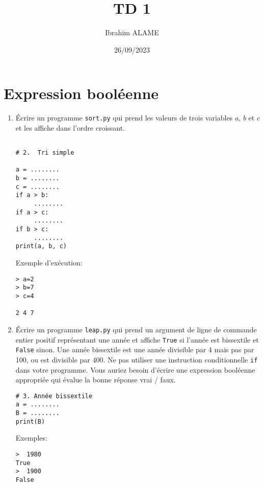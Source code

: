 \documentclass[a4paper]{article}
\title{TD 1}
\author{Ibrahim ALAME}
\date{26/09/2023}
\begin{document}
\maketitle



\section{Expression booléenne}
\begin{enumerate}
\item Écrire un programme {\tt sort.py} qui prend les valeurs de trois variables $a$, $b$ et $c$ et les affiche dans l'ordre croissant.
\begin{lstlisting}

# 2.  Tri simple

a = ........
b = ........
c = ........
if a > b:
     ........
if a > c:
     ........
if b > c:
     ........
print(a, b, c)

\end{lstlisting}

Exemple d'exécution:

\begin{verbatim}
> a=2
> b=7
> c=4

2 4 7
\end{verbatim}

\item Écrire un programme {\tt leap.py} qui prend un argument de ligne de commande entier positif représentant une année et affiche {\tt True} si l'année est bissextile et {\tt False} sinon. Une année bissextile est une année divisible par 4 mais pas par 100, ou est divisible par 400. Ne pas utiliser une instruction conditionnelle {\tt if} dans votre programme. Vous auriez besoin d'écrire une expression booléenne appropriée qui évalue la bonne réponse vrai / faux.
\begin{lstlisting}
# 3. Année bissextile
a = ........
B = ........
print(B)
\end{lstlisting}
Exemples:
\begin{verbatim}
>  1980
True
>  1900
False
\end{verbatim}
\end{enumerate}
\end{document}
